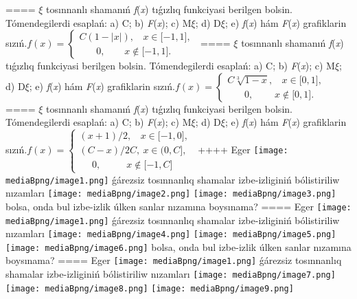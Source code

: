 ====
$\xi$ tosınnanlı shamanıń \emph{f}(\emph{x}) tıǵızlıq funkciyasi berilgen bolsin. Tómendegilerdi esaplań: a) C; b) \emph{F}(\emph{x}); c) M$\xi$; d) D$\xi$; e) \emph{f}(\emph{x}) hám \emph{F}(\emph{x}) grafiklarin sızıń.\(f(x) = \left\{ \begin{matrix}
C(1 - |x|),\ \ \ \ x \in \lbrack - 1,1\rbrack, \\
\ \ \ \ \ \ \ \ 0,\ \ \ \ \ \ \ \ \ x \notin \lbrack - 1,1\rbrack.\ \ 
\end{matrix} \right.\ \)
====
$\xi$ tosınnanlı shamanıń \emph{f}(\emph{x}) tıǵızlıq funkciyasi berilgen bolsin. Tómendegilerdi esaplań: a) C; b) \emph{F}(\emph{x}); c) M$\xi$; d) D$\xi$; e) \emph{f}(\emph{x}) hám \emph{F}(\emph{x}) grafiklarin sızıń.\(f(x) = \left\{ \begin{matrix}
C\sqrt[3]{1 - x},\ \ \ \ x \in \lbrack 0,1\rbrack, \\
\ \ \ \ \ \ \ \ 0,\ \ \ \ \ \ \ \ \ \ x \notin \lbrack 0,1\rbrack.\ \ 
\end{matrix} \right.\ \)
====
$\xi$ tosınnanlı shamanıń \emph{f}(\emph{x}) tıǵızlıq funkciyasi berilgen bolsin. Tómendegilerdi esaplań: a) C; b) \emph{F}(\emph{x}); c) M$\xi$; d) D$\xi$; e) \emph{f}(\emph{x}) hám \emph{F}(\emph{x}) grafiklarin sızıń.\(f(x) = \left\{ \begin{matrix}
(x + 1)/2,\ \ \ \ x \in \lbrack - 1,0\rbrack, \\
(C - x)/2C,\ x \in (0,C\rbrack, \\
\ \ \ \ \ \ 0,\ \ \ \ \ \ \ \ \ \ \ \ x \notin \lbrack - 1,C\rbrack\ \ 
\end{matrix} \right.\ \)
++++
Eger \texttt{[image: mediaBpng/image1.png]} ǵárezsiz tosınnanlıq shamalar izbe-izliginiń bólistiriliw nızamları
\texttt{[image: mediaBpng/image2.png]} \texttt{[image: mediaBpng/image3.png]}
bolsa, onda bul izbe-izlik úlken sanlar nızamına boysınama?
====
Eger \texttt{[image: mediaBpng/image1.png]} ǵárezsiz tosınnanlıq shamalar izbe-izliginiń bólistiriliw nızamları
\texttt{[image: mediaBpng/image4.png]} \texttt{[image: mediaBpng/image5.png]} \texttt{[image: mediaBpng/image6.png]}
bolsa, onda bul izbe-izlik úlken sanlar nızamına boysınama?
====
Eger \texttt{[image: mediaBpng/image1.png]} ǵárezsiz tosınnanlıq shamalar izbe-izliginiń bólistiriliw nızamları
\texttt{[image: mediaBpng/image7.png]} \texttt{[image: mediaBpng/image8.png]} \texttt{[image: mediaBpng/image9.png]}
